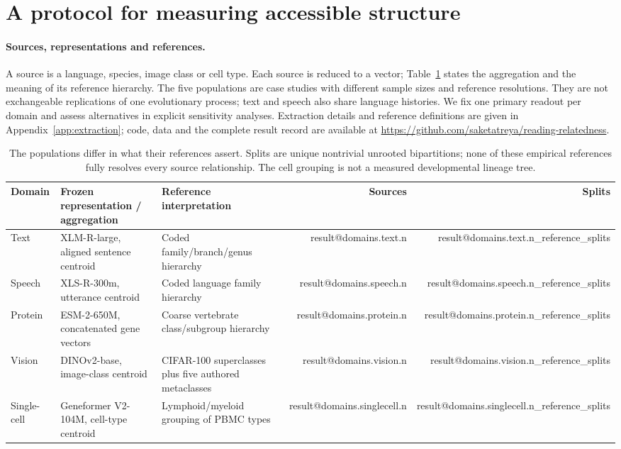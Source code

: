 \documentclass[mlmain]{jmlr}
\makeatletter
\newcommand{\Result}[1]{\csname result@#1\endcsname}
\makeatother
\begin{document}
\section{A protocol for measuring accessible structure}
\label{sec:protocol}

\paragraph{Sources, representations and references.}
A source is a language, species, image class or cell type. Each source is reduced to a vector;
Table~\ref{tab:populations} states the aggregation and the meaning of its reference hierarchy.
The five populations are case studies with different sample sizes and reference resolutions.
They are not exchangeable replications of one evolutionary process; text and speech also share
language histories. We fix one primary readout per domain and assess alternatives in explicit
sensitivity analyses. Extraction details and reference definitions are given in
Appendix~\ref{app:extraction}; code, data and the complete result record are available at
\url{https://github.com/saketatreya/reading-relatedness}.

\begin{table}[t]
\centering\small\setlength{\tabcolsep}{5pt}
\begin{tabular}{lp{}p{}rr}
\toprule
Domain & \raggedright Frozen representation / aggregation & \raggedright Reference interpretation & Sources & Splits \\
\midrule
Text & \raggedright XLM-R-large, aligned sentence centroid & \raggedright Coded family/branch/genus hierarchy & \Result{domains.text.n} & \Result{domains.text.n_reference_splits} \\
Speech & \raggedright XLS-R-300m, utterance centroid & \raggedright Coded language family hierarchy & \Result{domains.speech.n} & \Result{domains.speech.n_reference_splits} \\
Protein & \raggedright ESM-2-650M, concatenated gene vectors & \raggedright Coarse vertebrate class/subgroup hierarchy & \Result{domains.protein.n} & \Result{domains.protein.n_reference_splits} \\
Vision & \raggedright DINOv2-base, image-class centroid & \raggedright CIFAR-100 superclasses plus five authored metaclasses & \Result{domains.vision.n} & \Result{domains.vision.n_reference_splits} \\
Single-cell & \raggedright Geneformer V2-104M, cell-type centroid & \raggedright Lymphoid/myeloid grouping of PBMC types & \Result{domains.singlecell.n} & \Result{domains.singlecell.n_reference_splits} \\
\bottomrule
\end{tabular}
\caption{The populations differ in what their references assert. Splits are unique nontrivial
unrooted bipartitions; none of these empirical references fully resolves every source relationship.
The cell grouping is not a measured developmental lineage tree.}
\label{tab:populations}
\end{table}
\end{document}
